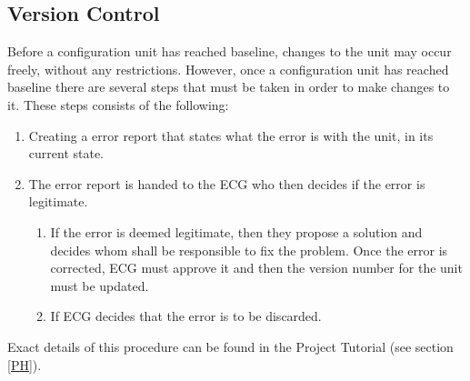 \documentclass{article}
\begin{document}
    \subsection{Version Control \label{versioncontrol}}
        Before a configuration unit has reached baseline, changes to the unit
        may occur freely, without any restrictions.
        However, once a configuration unit has reached baseline there are several steps
        that must be taken in order to make changes to it.
        These steps consists of the following:
        \begin{enumerate}
            \item Creating a error report that states what the
                    error is with the unit, in its current state.
            \item The error report is handed to the ECG who then decides if the error is              legitimate.
                \begin{enumerate}
                    \item If the error is deemed legitimate, then they
                    propose a solution and
                    decides whom shall be responsible to fix the problem.
                    Once the error is corrected, ECG must approve it
                    and then the version number for the unit must be updated.
                    \item If ECG decides that the error is to be discarded.
                \end{enumerate}
        \end{enumerate}
        Exact details of this procedure can be found in the Project Tutorial (see section \ref{PH}).
\end{document}
